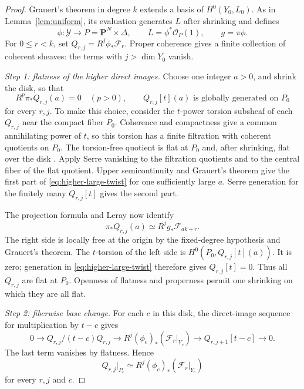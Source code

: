 \documentclass[11pt,a4paper]{article}
\numberwithin{equation}{section}
\theoremstyle{definition}
\theoremstyle{remark}
\newcommand{\PP}{\mathbf P}\newcommand{\HH}{\mathbb H}
\newcommand{\OO}{\mathcal O}\newcommand{\cX}{\mathcal X}
\begin{document}
\begin{proof}
Grauert's theorem in degree $k$ extends a basis of $H^0(Y_0,L_0)$.
As in Lemma~\ref{lem:uniform}, its evaluation generates $L$ after
shrinking and defines
\[
 \phi:\mathcal Y\to P=\PP^N\times\Delta,
 \qquad L=\phi^*\OO_P(1),\qquad g=\pi\phi.
\]
For $0\le r<k$, set $Q_{r,j}=R^j\phi_*\mathcal F_r$. Proper
coherence gives a finite collection of coherent sheaves: the terms
with $j>\dim Y_0$ vanish.

\emph{Step 1: flatness of the higher direct images.}
Choose one integer $a>0$, and shrink the disk, so that
\begin{equation}\label{eq:higher-large-twist}
 R^p\pi_*Q_{r,j}(a)=0\quad(p>0),
 \qquad Q_{r,j}[t](a)\text{ is globally generated on }P_0
\end{equation}
for every $r,j$. To make this choice, consider the $t$-power
torsion subsheaf of each $Q_{r,j}$ near the compact fiber $P_0$. Coherence
and compactness give a common annihilating power of $t$, so this
torsion has a finite filtration with coherent quotients on $P_0$.
The torsion-free quotient is flat at $P_0$ and, after shrinking,
flat over the disk \cite{Frisch1967}. Apply Serre vanishing to
the filtration quotients and to the central fiber of the flat
quotient. Upper semicontinuity and Grauert's theorem give the
first part of \eqref{eq:higher-large-twist} for one sufficiently
large $a$. Serre generation for the finitely many $Q_{r,j}[t]$
gives the second part.

The projection formula and Leray now identify
\[
 \pi_*Q_{r,j}(a)\simeq R^jg_*\mathcal F_{ak+r}.
\]
The right side is locally free at the origin by the fixed-degree
hypothesis and Grauert's theorem. The $t$-torsion of the left side
is $H^0(P_0,Q_{r,j}[t](a))$. It is zero; generation in
\eqref{eq:higher-large-twist} therefore gives $Q_{r,j}[t]=0$.
Thus all $Q_{r,j}$ are flat at $P_0$. Openness of flatness and
properness permit one shrinking on which they are all flat.

\smallskip\noindent\emph{Step 2: fiberwise base change.}
For each $c$ in this disk, the direct-image sequence for
multiplication by $t-c$ gives
\[
 0\longrightarrow Q_{r,j}/(t-c)Q_{r,j}
 \longrightarrow R^j(\phi_c)_*(\mathcal F_r|_{Y_c})
 \longrightarrow Q_{r,j+1}[t-c]\longrightarrow0.
\]
The last term vanishes by flatness. Hence
\begin{equation}\label{eq:higher-residue-base-change}
 Q_{r,j}|_{P_c}\simeq
 R^j(\phi_c)_*(\mathcal F_r|_{Y_c})
\end{equation}
for every $r,j$ and $c$.


\end{proof}
\end{document}
